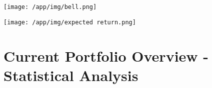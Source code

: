 \documentclass{article}
\begin{document}
\vspace{.4cm}
\begin{center}
\hspace*{-1cm}\texttt{[image: /app/img/bell.png]}\par

\vspace{.5cm}

\hspace*{-1cm}\texttt{[image: /app/img/expected return.png]}\par
\end{center}

\newpage

\section{Current Portfolio Overview - Statistical Analysis}

\vspace{1.5cm}

\end{document}
